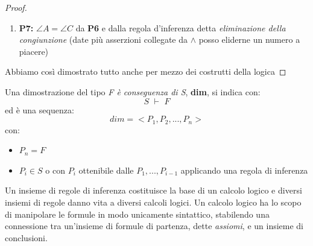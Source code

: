 \documentclass[a4paper,12pt, oneside]{book}
\begin{document}
\begin{proof}
\begin{enumerate}
\item \textbf{P7:} $\angle A=\angle C$ da \textbf{P6} e dalla regola d'inferenza detta \textit{eliminazione della congiunzione} (date più asserzioni collegate da $\wedge$ posso eliderne un numero a piacere)
\end{enumerate}
Abbiamo così dimostrato tutto anche per mezzo dei costrutti della logica
\end{proof}
\begin{definizione}
Una dimostrazione del tipo \textit{F è conseguenza di S}, \textbf{dim}, si indica con:
$$S\,\,\vdash\,\, F$$
ed è una sequenza:
$$dim=<P_1,P_2,...,P_n>$$
con:
\begin{itemize}
\item $P_n=F$
\item $P_i\in S$ o con $P_i$ ottenibile dalle $P_1,...,P_{i-1}$ applicando una regola di inferenza
\end{itemize}
\end{definizione}
Un insieme di regole di inferenza costituisce la base di un calcolo logico e diversi insiemi di regole danno vita a diversi calcoli logici. Un calcolo logico ha lo scopo di manipolare le formule in modo unicamente sintattico, stabilendo una connessione tra un'insieme di formule di partenza, dette \textit{assiomi}, e un insieme di conclusioni.
\end{document}
